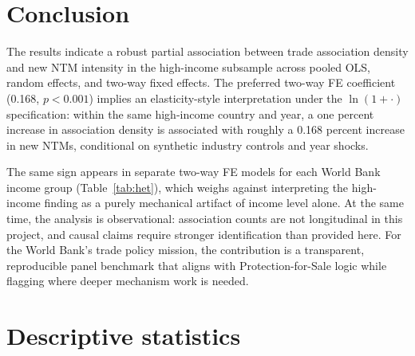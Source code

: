 \documentclass[12pt,letterpaper]{article}
\begin{document}
\section{Conclusion}

The results indicate a robust partial association between trade association density and new NTM intensity in the high-income subsample across pooled OLS, random effects, and two-way fixed effects. The preferred two-way FE coefficient (0.168, $p<0.001$) implies an elasticity-style interpretation under the $\ln(1+\cdot)$ specification: within the same high-income country and year, a one percent increase in association density is associated with roughly a 0.168 percent increase in new NTMs, conditional on synthetic industry controls and year shocks.

The same sign appears in separate two-way FE models for each World Bank income group (Table~\ref{tab:het}), which weighs against interpreting the high-income finding as a purely mechanical artifact of income level alone. At the same time, the analysis is observational: association counts are not longitudinal in this project, and causal claims require stronger identification than provided here. For the World Bank's trade policy mission, the contribution is a transparent, reproducible panel benchmark that aligns with Protection-for-Sale logic while flagging where deeper mechanism work is needed.

\newpage
\appendix
\section{Descriptive statistics}
\end{document}
